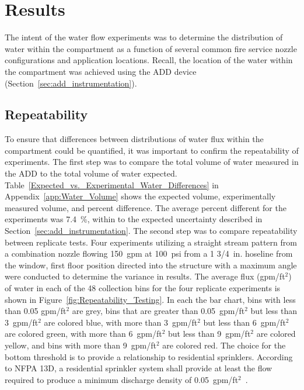 \documentclass[12pt,oneside]{book}
\begin{document}
\chapter{Results}

The intent of the water flow experiments was to determine the distribution of water within the compartment as a function of several common fire service nozzle configurations and application locations. Recall, the location of the water within the compartment was achieved using the ADD device (Section~\ref{sec:add_instrumentation}). 

\section{Repeatability}
\label{sec:repeat}
To ensure that differences between distributions of water flux within the compartment could be quantified, it was important to confirm the repeatability of experiments. The first step was to compare the total volume of water measured in the ADD to the total volume of water expected. Table~\ref{Expected_vs._Experimental_Water_Differences} in Appendix~\ref{app:Water_Volume} shows the expected volume, experimentally measured volume, and percent difference. The average percent different for the experiments was 7.4~\%, within to the expected uncertainty described in Section~\ref{sec:add_instrumentation}. The second step was to compare repeatability between replicate tests. Four experiments utilizing a straight stream pattern from a combination nozzle flowing 150~gpm at 100~psi from a 1 3/4~in. hoseline from the window, first floor position directed into the structure with a maximum angle were conducted to determine the variance in results. The average flux (gpm/ft$^2$) of water in each of the 48 collection bins for the four replicate experiments is shown in Figure~\ref{fig:Repeatability_Testing}. In each the bar chart, bins with less than 0.05 gpm/ft$^2$ are grey, bins that are greater than 0.05~gpm/ft$^2$ but less than 3~gpm/ft$^2$ are colored blue, with more than 3~gpm/ft$^2$ but less than 6~gpm/ft$^2$ are colored green, with more than 6~gpm/ft$^2$ but less than 9~gpm/ft$^2$ are colored yellow, and bins with more than 9~gpm/ft$^2$ are colored red. The choice for the bottom threshold is to provide a relationship to residential sprinklers. According to NFPA 13D, a residential sprinkler system shall provide at least the flow required to produce a minimum discharge density of 0.05~gpm/ft$^2$~\cite{NFPA_13D}.
\end{document}

